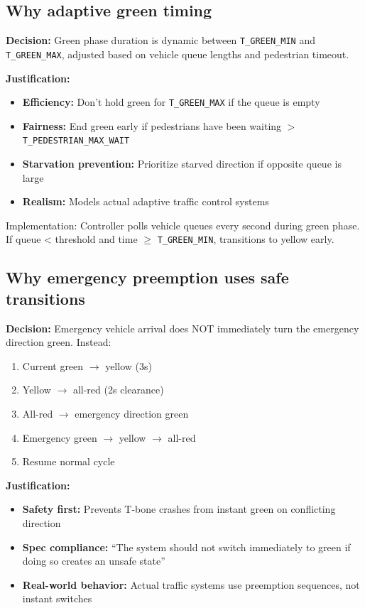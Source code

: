 \documentclass[11pt,a4paper]{article}
\begin{document}
\subsection{Why adaptive green timing}

\textbf{Decision:} Green phase duration is dynamic between \texttt{T\_GREEN\_MIN} and \texttt{T\_GREEN\_MAX}, adjusted based on vehicle queue lengths and pedestrian timeout.

\textbf{Justification:}
\begin{itemize}[noitemsep]
    \item \textbf{Efficiency:} Don't hold green for \texttt{T\_GREEN\_MAX} if the queue is empty
    \item \textbf{Fairness:} End green early if pedestrians have been waiting $>$ \texttt{T\_PEDESTRIAN\_MAX\_WAIT}
    \item \textbf{Starvation prevention:} Prioritize starved direction if opposite queue is large
    \item \textbf{Realism:} Models actual adaptive traffic control systems
\end{itemize}

Implementation: Controller polls vehicle queues every second during green phase. If queue < threshold and time $\geq$ \texttt{T\_GREEN\_MIN}, transitions to yellow early.

\newpage
\subsection{Why emergency preemption uses safe transitions}

\textbf{Decision:} Emergency vehicle arrival does NOT immediately turn the emergency direction green. Instead:
\begin{enumerate}[noitemsep]
    \item Current green $\rightarrow$ yellow (3s)
    \item Yellow $\rightarrow$ all-red (2s clearance)
    \item All-red $\rightarrow$ emergency direction green
    \item Emergency green $\rightarrow$ yellow $\rightarrow$ all-red
    \item Resume normal cycle
\end{enumerate}

\textbf{Justification:}
\begin{itemize}[noitemsep]
    \item \textbf{Safety first:} Prevents T-bone crashes from instant green on conflicting direction
    \item \textbf{Spec compliance:} ``The system should not switch immediately to green if doing so creates an unsafe state''
    \item \textbf{Real-world behavior:} Actual traffic systems use preemption sequences, not instant switches
\end{itemize}
\end{document}
